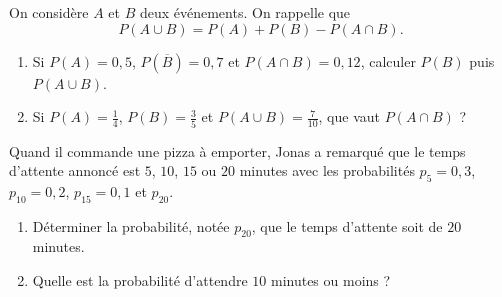 \documentclass[11pt]{article}
\begin{document}
\begin{exo}
On considère $A$ et $B$ deux événements. On rappelle que
\[
  P(A\cup B)=P(A)+P(B)-P(A\cap B).
\]
\begin{enumerate}
  \item Si $P(A)=0,5$, $P(\overline B)=0,7$ et $P(A\cap B)=0,12$, calculer
    $P(B)$ puis $P(A\cup B)$.
  \item Si $P(A)=\frac{1}{4}$, $P(B)=\frac{3}{5}$ et $P(A\cup
    B)=\frac{7}{10}$, que vaut $P(A\cap B)$ ?
\end{enumerate}
\end{exo}

\begin{exo}
Quand il commande une pizza à emporter, Jonas a remarqué
que le temps d'attente annoncé est $5$, $10$, $15$ ou $20$ minutes avec les
probabilités $p_5=0,3$, $p_{10}=0,2$, $p_{15} = 0,1$ et
$p_{20}$.
\begin{enumerate}
  \item Déterminer la probabilité, notée $p_{20}$, que le temps d'attente soit de $20$ minutes.
  \item Quelle est la probabilité d'attendre $10$ minutes ou moins ?
\end{enumerate}
\end{exo}
\end{document}

